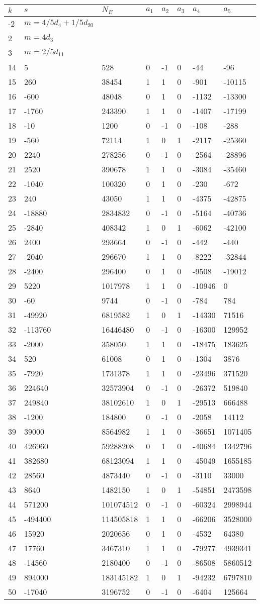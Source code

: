 \documentclass{amsart}
\begin{document}
\begin{longtable}{|l|l|l|lllll|}
\hline
$k$ & $s$ & $N_E$ & $a_1$ & $a_2$ & $a_3$ & $a_4$ & $a_5$\\
\hline
-2&$m=4/5d_{4}+1/5d_{20}$&&\multicolumn{5}{c|}{}\\
2&$m=4d_{3}$&&\multicolumn{5}{c|}{}\\
3&$m=2/5d_{11}$&&\multicolumn{5}{c|}{}\\
14&5&528&0&-1&0&-44&-96\\
15&260&38454&1&1&0&-901&-10115\\
16&-600&48048&0&1&0&-1132&-13300\\
17&-1760&243390&1&1&0&-1407&-17199\\
18&-10&1200&0&-1&0&-108&-288\\
19&-560&72114&1&0&1&-2117&-25360\\
20&2240&278256&0&-1&0&-2564&-28896\\
21&2520&390678&1&1&0&-3084&-35460\\
22&-1040&100320&0&1&0&-230&-672\\
23&240&43050&1&1&0&-4375&-42875\\
24&-18880&2834832&0&-1&0&-5164&-40736\\
25&-2840&408342&1&0&1&-6062&-42100\\
26&2400&293664&0&-1&0&-442&-440\\
27&-2040&296670&1&1&0&-8222&-32844\\
28&-2400&296400&0&1&0&-9508&-19012\\
29&5220&1017978&1&1&0&-10946&0\\
30&-60&9744&0&-1&0&-784&784\\
31&-49920&6819582&1&0&1&-14330&71516\\
32&-113760&16446480&0&-1&0&-16300&129952\\
33&-2000&358050&1&1&0&-18475&183625\\
34&520&61008&0&1&0&-1304&3876\\
35&-7920&1731378&1&1&0&-23496&371520\\
36&224640&32573904&0&-1&0&-26372&519840\\
37&249840&38102610&1&0&1&-29513&666488\\
38&-1200&184800&0&-1&0&-2058&14112\\
39&39000&8564982&1&1&0&-36651&1071405\\
40&426960&59288208&0&1&0&-40684&1342796\\
41&382680&68123094&1&1&0&-45049&1655185\\
42&28560&4873440&0&-1&0&-3110&33000\\
43&8640&1482150&1&0&1&-54851&2473598\\
44&571200&101074512&0&-1&0&-60324&2998944\\
45&-494400&114505818&1&1&0&-66206&3528000\\
46&15920&2020656&0&1&0&-4532&64380\\
47&17760&3467310&1&1&0&-79277&4939341\\
48&-14560&2180400&0&-1&0&-86508&5860512\\
49&894000&183145182&1&0&1&-94232&6797810\\
50&-17040&3196752&0&-1&0&-6404&125664\\
\hline
\end{longtable}
\end{document}
